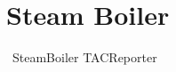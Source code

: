 \documentclass{report} %
\begin{document}
\chapter{Steam Boiler}
\begin{circus}
  \circprocess\ SteamBoiler \circdef TACReporter
\end{circus}




%
\end{document}
